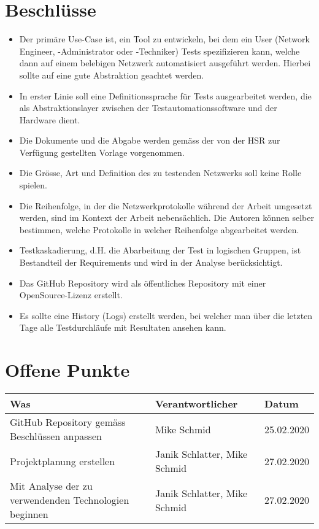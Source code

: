 \documentclass[
	ngerman,
	toc=listof, %
	toc=bibliography, %
	footnotes=multiple, %
	parskip=half, %
	numbers=noendperiod %
]{scrartcl}
\begin{document}
\section*{Beschlüsse}
\begin{itemize}
	\item Der primäre Use-Case ist, ein Tool zu entwickeln, bei dem ein User (Network Engineer, -Administrator oder -Techniker) Tests spezifizieren kann, welche dann auf einem belebigen Netzwerk automatisiert ausgeführt werden. Hierbei sollte auf eine gute Abstraktion geachtet werden.
	\item In erster Linie soll eine Definitionssprache für Tests ausgearbeitet werden, die als Abstraktionslayer zwischen der Testautomationssoftware und der Hardware dient.
	\item Die Dokumente und die Abgabe werden gemäss der von der HSR zur Verfügung gestellten Vorlage vorgenommen.
	\item Die Grösse, Art und Definition des zu testenden Netzwerks soll keine Rolle spielen. 
	\item Die Reihenfolge, in der die Netzwerkprotokolle während der Arbeit umgesetzt werden, sind im Kontext der Arbeit nebensächlich. Die Autoren können selber bestimmen, welche Protokolle in welcher Reihenfolge abgearbeitet werden.
	\item Testkaskadierung, d.H. die Abarbeitung der Test in logischen Gruppen, ist Bestandteil der Requirements und wird in der Analyse berücksichtigt.
	\item Das GitHub Repository wird als öffentliches Repository mit einer OpenSource-Lizenz erstellt.
	\item Es sollte eine History (Logs) erstellt werden, bei welcher man über die letzten Tage alle Testdurchläufe mit Resultaten ansehen kann.
\end{itemize}

\section*{Offene Punkte}
\begin{tabularx}{0.9\linewidth}{Xll}
	\toprule
	Was & Verantwortlicher & Datum \\
	\midrule
	GitHub Repository gemäss Beschlüssen anpassen & Mike Schmid & 25.02.2020 \\
	Projektplanung erstellen & Janik Schlatter, Mike Schmid & 27.02.2020 \\
	Mit Analyse der zu verwendenden Technologien beginnen & Janik Schlatter, Mike Schmid & 27.02.2020 \\
	\bottomrule
\end{tabularx}
\end{document}
